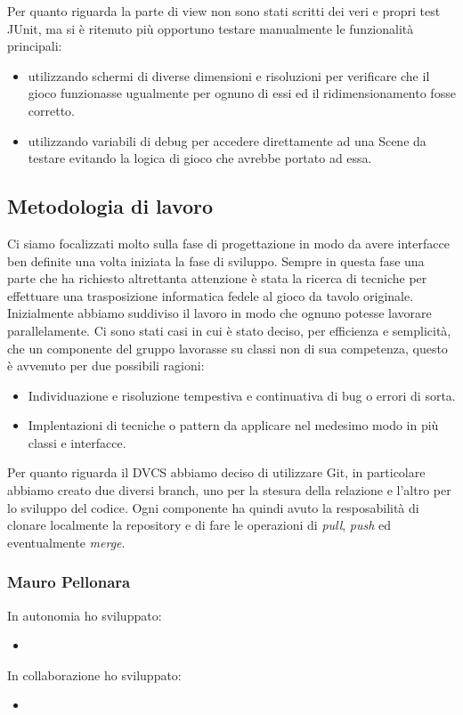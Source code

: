 Per quanto riguarda la parte di view non sono stati scritti dei veri e propri test JUnit, ma si è ritenuto più opportuno testare manualmente le funzionalità principali:
\begin{itemize}
    \item utilizzando schermi di diverse dimensioni e risoluzioni per verificare che il gioco funzionasse ugualmente per ognuno di essi ed il ridimensionamento fosse corretto.
    \item utilizzando variabili di debug per accedere direttamente ad una Scene da testare evitando la logica di gioco che avrebbe portato ad essa.
\end{itemize}

\subsection{Metodologia di lavoro}
Ci siamo focalizzati molto sulla fase di progettazione in modo da avere interfacce ben definite una volta iniziata la fase di sviluppo. Sempre in questa fase una parte che ha richiesto altrettanta attenzione è stata la ricerca di tecniche per effettuare una trasposizione informatica fedele al gioco da tavolo originale. Inizialmente abbiamo suddiviso il lavoro in modo che ognuno potesse lavorare parallelamente. Ci sono stati casi in cui è stato deciso, per efficienza e semplicità, che un componente del gruppo lavorasse su classi non di sua competenza, questo è avvenuto per due possibili ragioni:
\begin{itemize}
    \item Individuazione e risoluzione tempestiva e continuativa di bug o errori di sorta.
    \item Implentazioni di tecniche o pattern da applicare nel medesimo modo in più classi e interfacce.
\end{itemize}
Per quanto riguarda il DVCS abbiamo deciso di utilizzare Git, in particolare abbiamo creato due diversi branch, uno per la stesura della relazione e l'altro per lo sviluppo del codice. Ogni componente ha quindi avuto la resposabilità di clonare localmente la repository e di fare le operazioni di \textit{pull}, \textit{push} ed eventualmente \textit{merge}.
\subsubsection*{Mauro Pellonara}
In autonomia ho sviluppato:
\begin{itemize}
    \item
\end{itemize}
In collaborazione ho sviluppato:
\begin{itemize}
    \item
\end{itemize}

